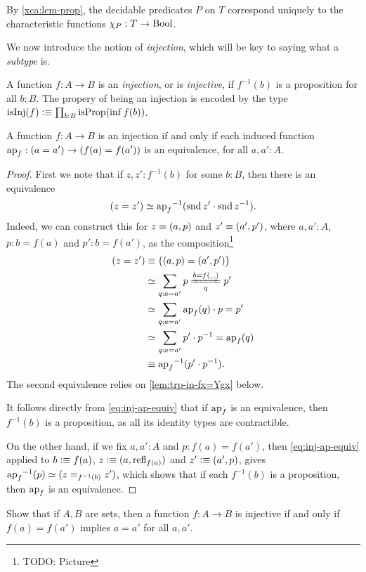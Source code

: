By \cref{xca:lem-prop}, the decidable predicates $P$ on $T$
correspond uniquely to the characteristic functions $\chi_P:T\to\mathrm{Bool}$.

We now introduce the notion of \emph{injection}, which will be key to saying what a \emph{subtype} is.

\begin{definition}\label{def:injection}
  A function $f:A\to B$ is an \emph{injection}, or is \emph{injective},
  if $f^{-1}(b)$ is a proposition for all $b:B$.  The propery of being an injection is encoded by
  the type $\isinj(f) \defeq \prod_{b:B} \isprop(\inf f (b))$.
\end{definition}

\begin{lemma}\label{lem:inj-ap}
  A function $f:A\to B$ is an injection if and only if
  each induced function
  $\ap{f}: (a=a') \to (f(a)=f(a'))$ is an equivalence,
  for all $a,a':A$.
\end{lemma}

\begin{proof}
  First we note that if $z,z' : f^{-1}(b)$ for some $b:B$,
  then there is an equivalence
  \begin{equation}\label{eq:inj-ap-equiv}
    (z = z') \equiv \ap{f}^{-1}(\snd{z'} \cdot \inv{\snd{z}}).
  \end{equation}
  Indeed, we can construct this for $z\jdeq(a,p)$ and $z'\jdeq(a',p')$,
  where $a,a':A$, $p:b=f(a)$ and $p':b=f(a')$,
  as the composition\footnote{%
    TODO: Picture}
  \begin{align*}
    (z = z')
    &\jdeq \bigl( (a,p) = (a',p') \bigr) \\
    &\equiv \sum_{q : a=a'} \pathover{p}{b=f(\blank)}{q}{p'} \\
    &\equiv \sum_{q : a=a'} \ap{f}(q) \cdot p = p' \\
    &\equiv \sum_{q : a=a'} p' \cdot \inv p = \ap{f}(q) \\
    &\jdeq \ap{f}^{-1}(p' \cdot \inv p).
  \end{align*}
  The second equivalence relies on \cref{lem:trp-in-fx=Ygx} below.

  It follows directly from \eqref{eq:inj-ap-equiv}
  that if $\ap{f}$ is an equivalence,
  then $f^{-1}(b)$ is a proposition,
  as all its identity types are contractible.

  On the other hand, if we fix $a,a':A$ and $p:f(a)=f(a')$,
  then \eqref{eq:inj-ap-equiv} applied to $b \defeq f(a)$,
  $z \defeq (a,\refl{f(a)})$ and
  $z' \defeq (a',p)$,
  gives $\ap{f}^{-1}(p) \equiv (z=_{f^{-1}(b)}z')$,
  which shows that if each $f^{-1}(b)$ is a proposition,
  then $\ap{f}$ is an equivalence.
\end{proof}
\begin{xca}\label{xca:inj-sets}
  Show that if $A,B$ are sets, then a function
  $f : A \to B$ is injective if and only if
  $f(a)=f(a')$ implies $a=a'$ for all $a,a'$.
\end{xca}

